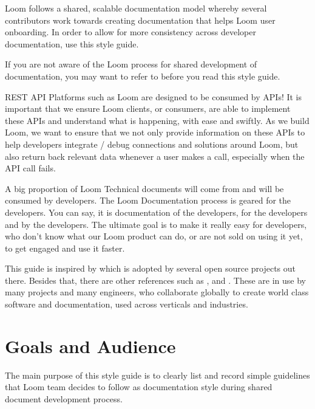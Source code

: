\documentclass[letterpaper,10pt,english]{sphinxmanual}
\begin{document}
Loom follows a shared, scalable documentation model whereby several contributors work towards creating documentation that helps Loom user onboarding. In order to allow for more consistency across developer documentation, use this style guide.

If you are not aware of the Loom process for shared development of documentation, you may want to refer to {\hyperref[\detokenize{mcdmp_docx_res:content-all-mcdmp-doc-process}]{}} before you read this style guide.

REST API Platforms such as Loom are designed to be consumed by APIs! It is important that we ensure Loom clients, or consumers, are able to implement these APIs and understand what is happening, with ease and swiftly. As we build Loom, we want to ensure that we not only provide information on these APIs to help developers integrate / debug connections and solutions around Loom, but also return back relevant data whenever a user makes a call, especially when the API call fails.

A big proportion of Loom Technical documents will come from and will be consumed by developers. The Loom Documentation process is geared for the developers.  You can say, it is documentation of the developers, for the developers and by the developers. The ultimate goal is to make it really easy for developers, who don’t know what our Loom product can do, or are not sold on using it yet, to get engaged and use it faster.

This guide is inspired by  which is adopted by several open source projects out there. Besides that, there are other references such as , and . These are in use by many projects and many engineers, who collaborate globally to create world class software and documentation, used across verticals and industries.


\section{Goals and Audience}
\label{\detokenize{mcdmp_docx_res:goals-and-audience}}
The main purpose of this style guide is to clearly list and record simple guidelines that Loom team decides to follow as documentation style during shared document development process.
\end{document}
